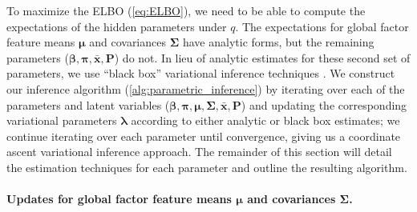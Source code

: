 \documentclass[twoside,11pt]{article}
\begin{document}
To maximize the ELBO (\cref{eq:ELBO}), we need to be able to compute the expectations of the hidden parameters under $q$. The expectations for global factor feature means $\boldsymbol{\mu}$ and covariances $\boldsymbol{\Sigma}$ have analytic forms, but the remaining parameters ($\boldsymbol{\beta}, \boldsymbol{\pi}, \boldsymbol{\bar{x}}, \boldsymbol{P}$) do not. In lieu of analytic estimates for these second set of parameters, we use ``black box'' variational inference techniques \citep{Ranganath:2015}.  We construct our inference algorithm (\cref{alg:parametric_inference}) by iterating over each of the parameters and latent variables ($\boldsymbol{\beta}, \boldsymbol{\pi}, \boldsymbol{\mu}, \boldsymbol{\Sigma}, \boldsymbol{\bar{x}}, \boldsymbol{P}$) and updating the corresponding variational parameters $\boldsymbol{\lambda}$ according to either analytic or black box estimates; we continue iterating over each parameter until convergence, giving us a coordinate ascent variational inference approach.  The remainder of this section will detail the estimation techniques for each parameter and outline the resulting algorithm.

\paragraph{Updates for global factor feature means $\boldsymbol{\mu}$ and covariances $\boldsymbol{\Sigma}$.}
\end{document}
